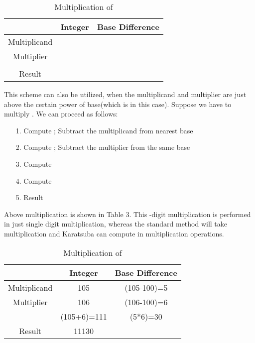 \documentclass[conference]{IEEEtran}
\begin{document}
\begin{table}[ht]
\renewcommand{\arraystretch}{1.3}
\caption{Multiplication of }
\label{table 2}
\begin{center}
\begin{tabular}{|c| c| c| } 
\hline
 & Integer & Base Difference    \\ [1ex] \hline\hline 
Multiplicand &  &    \\ \hline
Multiplier &  &   \\ \hline
 &  &   \\ \hline
Result &  &   \\ [1ex] \hline

\end{tabular} 
\end{center}
\end{table} 

This scheme can also be utilized, when the multiplicand and multiplier are just above the certain power of base(which is  in this case). Suppose we have to multiply . We can proceed as follows:
\begin{enumerate}
 \item[1.] Compute ; Subtract the multiplicand from nearest base 
 \item[2.] Compute ; Subtract the multiplier from the same base
 \item[3.] Compute 
 \item[4.] Compute  
 \item[5.] Result  
\end{enumerate}

Above multiplication is shown in Table 3. This -digit multiplication is performed in just single  digit multiplication, whereas the standard method will take  multiplication and Karatsuba can compute in  multiplication operations.

\begin{table}[ht]
\renewcommand{\arraystretch}{1.3}
\caption{Multiplication of }
\label{table 3}
\begin{center}
\begin{tabular}{|c| c| c| } 
\hline
 & Integer & Base Difference    \\ [1ex] \hline\hline 
Multiplicand & 105 & (105-100)=5   \\ \hline
Multiplier & 106 & (106-100)=6  \\ \hline
 & (105+6)=111 & (5*6)=30  \\ \hline
Result & 11130 &   \\ [1ex] \hline

\end{tabular} 
\end{center}
\end{table} 
\end{document}

